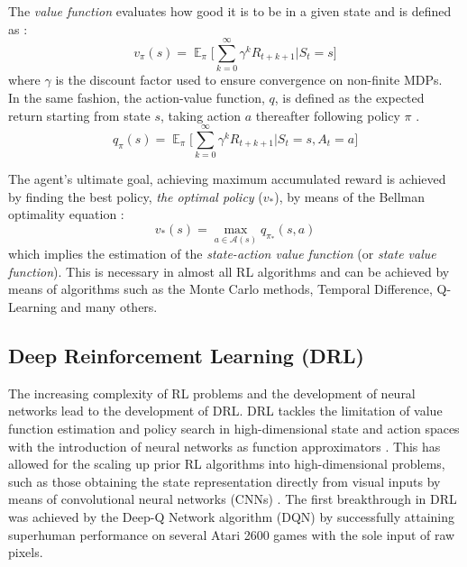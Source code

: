 \documentclass{article}
\begin{document}
The \textit{value function} evaluates how good it is to be in a given state and is defined as \citep{Sutton1998ReinforcementIntroduction}:
\begin{equation}
    v_{\pi}(s)=\mathop{\mathbb{E}}_{\pi} \Big [ \sum_{k=0}^{\infty} \gamma^k R_{t+k+1} \big | S_{t}=s \Big]
\end{equation}
where $\gamma$ is the discount factor used to ensure convergence on non-finite MDPs.\\
In the same fashion, the action-value function, $q$, is defined as the expected return starting from state $s$, taking action $a$ thereafter following policy $\pi$ \cite{Sutton1998ReinforcementIntroduction}.
\begin{equation}
    q_{\pi}(s)=\mathop{\mathbb{E}}_{\pi} \Big [ \sum_{k=0}^{\infty} \gamma^k R_{t+k+1}\big | S_{t}=s ,A_{t}=a \Big ]
\end{equation}

The agent's ultimate goal, achieving maximum accumulated reward is achieved by finding the best policy, \textit{the optimal policy} ($v_{*}$), by means of the Bellman optimality equation \citep{Sutton1998ReinforcementIntroduction}:
\begin{equation}
    v_{*}(s)=\max_{a \in \mathcal{A}(s)} q_{\pi_{*}}(s,a)
\end{equation}
which implies the estimation of the \textit{state-action value function} (or \textit{state value function}). This is necessary in almost all RL algorithms and can be achieved by means of algorithms such as the Monte Carlo methods, Temporal Difference, Q-Learning and many others.
\subsection{Deep Reinforcement Learning (DRL)}
The increasing complexity of RL problems and the development of neural networks lead to the development of DRL. DRL tackles the limitation of value function estimation and policy search in high-dimensional state and action spaces with the introduction of neural networks as function approximators \citep{Arulkumaran2017ALearning}. This has allowed for the scaling up prior RL algorithms into high-dimensional problems, such as those obtaining the state representation directly from visual inputs by means of convolutional neural networks (CNNs) \citep{Arulkumaran2017ALearning}. The first breakthrough in DRL was achieved by the Deep-Q Network algorithm (DQN) \citep{MnihPlayingLearning} by successfully attaining superhuman performance on several Atari 2600 games with the sole input of raw pixels.
\end{document}
